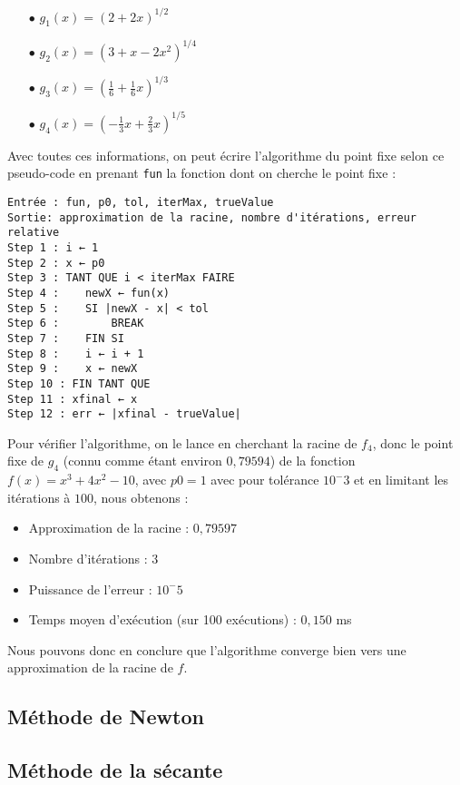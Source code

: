 \documentclass[12pt]{article}
\begin{document}
\begin{multicols}{2}
\begin{itemize}
    \item[$\bullet$] $g_1(x)=(2 + 2x)^{1/2}$
    \item[$\bullet$] $g_2(x)=(3 + x - 2x^2)^{1/4}$
    \item[$\bullet$] $g_3(x)=(\frac{1}{6}   + \frac{1}{6}x)^{1/3}$
    \item[$\bullet$] $g_4(x)=(-\frac{1}{3}x+\frac{2}{3}x)^{1/5}$
\end{itemize}
\end{multicols}
\noindent Avec toutes ces informations, on peut écrire l'algorithme du point fixe selon ce pseudo-code en prenant \texttt{fun} la fonction dont on cherche le point fixe :
\begin{verbatim}
Entrée : fun, p0, tol, iterMax, trueValue
Sortie: approximation de la racine, nombre d'itérations, erreur relative
Step 1 : i ← 1
Step 2 : x ← p0
Step 3 : TANT QUE i < iterMax FAIRE
Step 4 :    newX ← fun(x)
Step 5 :    SI |newX - x| < tol
Step 6 :        BREAK
Step 7 :    FIN SI
Step 8 :    i ← i + 1
Step 9 :    x ← newX
Step 10 : FIN TANT QUE
Step 11 : xfinal ← x
Step 12 : err ← |xfinal - trueValue|
\end{verbatim}
\noindent Pour vérifier l'algorithme, on le lance en cherchant la racine de $f_4$, donc le point fixe de $g_4$ (connu comme étant environ $0,79594$) de la fonction $f(x) = x^3 + 4x^2 -10$, avec $p0 = 1$ avec pour tolérance $10^-3$ et en limitant les itérations à $100$, nous obtenons :
\begin{itemize}
    \item Approximation de la racine : $0,79597$
    \item Nombre d'itérations : $3$
    \item Puissance de l'erreur : $10^-5$
    \item Temps moyen d'exécution (sur 100 exécutions) : $0,150$ ms
\end{itemize}
Nous pouvons donc en conclure que l'algorithme converge bien vers une approximation de la racine de $f$.


\subsection{Méthode de Newton}
\label{ref:newton}


\subsection{Méthode de la sécante}
\label{ref:sécante}
\end{document}
